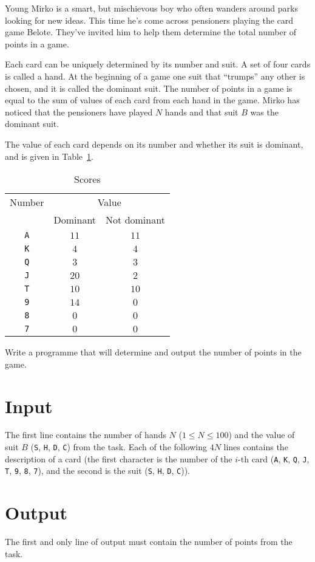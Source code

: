 
Young Mirko is a smart, but mischievous boy who often wanders around
parks looking for new ideas.  This time he's come across pensioners
playing the card game Belote. They've invited him to help them
determine the total number of points in a game.

Each card can be uniquely determined by its number and suit. A set of
four cards is called a hand. At the beginning of a game one suit that
``trumps'' any other is chosen, and it is called the dominant
suit. The number of points in a game is equal to the sum of values of
each card from each hand in the game. Mirko has noticed that the
pensioners have played $N$ hands and that suit $B$ was the dominant
suit.

The value of each card depends on its number and whether its suit is
dominant, and is given in Table~\ref{tab:score}.

\begin{table}[h]
  \centering
  \begin{tabular}{ccc}
    Number & \multicolumn{2}{c}{Value}\\
& Dominant & Not dominant\\
\texttt{A} & $11$ & $11$\\
\texttt{K} & $4$ & $4$\\
\texttt{Q} & $3$ & $3$\\
\texttt{J} & $20$ & $2$\\
\texttt{T} & $10$ & $10$\\
\texttt{9} & $14$ & $0$\\
\texttt{8} & $0$ & $0$\\
\texttt{7} & $0$ & $0$\\
  \end{tabular}
  \caption{Scores}
  \label{tab:score}
\end{table}

Write a programme that will determine and output the number of points in the game.

\section*{Input}

The first line contains the number of hands $N$ ($1 \leq N \leq 100$) and the value of suit $B$ (\texttt{S}, \texttt{H}, \texttt{D}, \texttt{C})
from the task.
Each of the following $4N$ lines contains the description of a card (the first character is the number
of the $i$-th card (\texttt{A}, \texttt{K}, \texttt{Q}, \texttt{J}, \texttt{T}, \texttt{9}, \texttt{8}, \texttt{7}), and the second is the suit (\texttt{S}, \texttt{H}, \texttt{D}, \texttt{C})).

\section*{Output}

The first and only line of output must contain the number of points from the task.